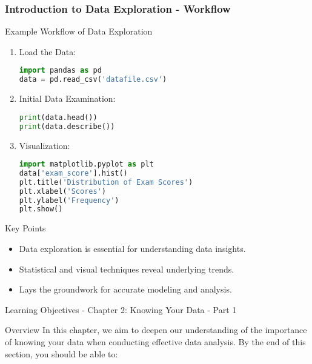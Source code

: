 \documentclass[aspectratio=169]{beamer}
\begin{document}
\begin{frame}[fragile]
    \frametitle{Introduction to Data Exploration - Workflow}
    \begin{block}{Example Workflow of Data Exploration}
        \begin{enumerate}
            \item Load the Data:
            \begin{lstlisting}[language=Python]
import pandas as pd
data = pd.read_csv('datafile.csv')
            \end{lstlisting}
            
            \item Initial Data Examination:
            \begin{lstlisting}[language=Python]
print(data.head())
print(data.describe())
            \end{lstlisting}
            
            \item Visualization:
            \begin{lstlisting}[language=Python]
import matplotlib.pyplot as plt
data['exam_score'].hist()
plt.title('Distribution of Exam Scores')
plt.xlabel('Scores')
plt.ylabel('Frequency')
plt.show()
            \end{lstlisting}
        \end{enumerate}
    \end{block}
    
    \begin{block}{Key Points}
        \begin{itemize}
            \item Data exploration is essential for understanding data insights.
            \item Statistical and visual techniques reveal underlying trends.
            \item Lays the groundwork for accurate modeling and analysis.
        \end{itemize}
    \end{block}
\end{frame}

\begin{frame}[fragile]{Learning Objectives - Chapter 2: Knowing Your Data - Part 1}
    \begin{block}{Overview}
        In this chapter, we aim to deepen our understanding of the importance of knowing your data when conducting effective data analysis. 
        By the end of this section, you should be able to:
    \end{block}
\end{frame}
\end{document}
